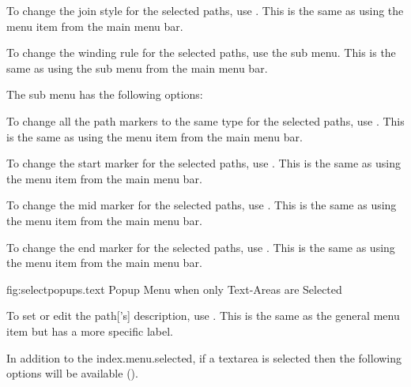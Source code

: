 
To change the join style for the selected paths,
use . This is the same as using the
 menu item from the main menu bar.

To change the winding rule for the selected paths,
use the  sub menu. This is the same as using the
 sub menu from the main menu bar.


The  sub menu has the following options:


To change all the path markers to the same type for the selected paths,
use . This is the same as using the
 menu item from the main menu bar.


To change the start marker for the selected paths,
use . This is the same as using the
 menu item from the main menu bar.


To change the mid marker for the selected paths,
use . This is the same as using the
 menu item from the main menu bar.


To change the end marker for the selected paths,
use . This is the same as using the
 menu item from the main menu bar.




\FloatFig
  {fig:selectpopups.text}
  {}
  {Popup Menu when only Text-Areas are Selected}


To set or edit the \gls{path}['s] description, use
. This is the same as
the general  menu item but has a more specific label.

In addition to the \gls{index.menu.selected},
if a \gls{textarea} is selected then the following options will be available
().

